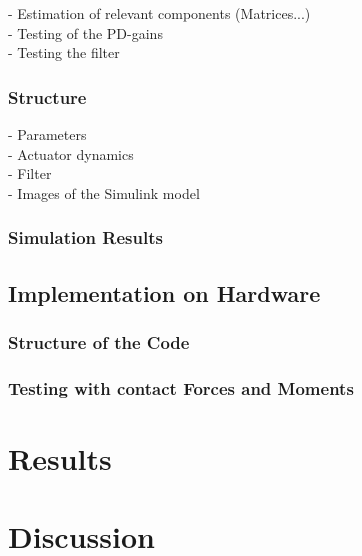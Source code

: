 \documentclass[11pt, a4paper, twoside]{report}
\begin{document}
- Estimation of relevant components (Matrices...)\\
- Testing of the PD-gains\\
- Testing the filter

\subsection{Structure} \label{subsec:Structure}
- Parameters\\
- Actuator dynamics\\
- Filter\\
- Images of the Simulink model

\subsection{Simulation Results} \label{subsec:simulation_results}

\section{Implementation on Hardware} \label{sec:implementation_on_hardware}

\subsection{Structure of the Code} \label{subsec:structure_ofthe_code}

\subsection{Testing with contact Forces and Moments} \label{subsec:testing_with_fandm}

\chapter{Results} \label{cha:results}

\thispagestyle{fancy}



\chapter{Discussion} \label{cha:discussion}

\thispagestyle{fancy}
\end{document}

